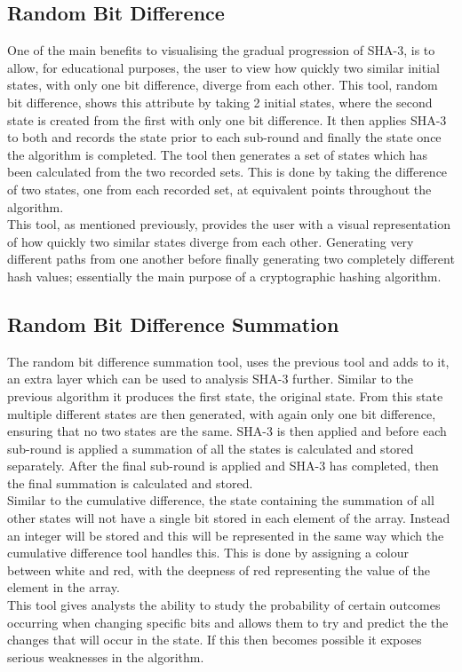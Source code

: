 \subsection{Random Bit Difference}
One of the main benefits to visualising the gradual progression of SHA-3, is to allow, for educational purposes, the user to view how quickly two similar initial states, with only one bit difference, diverge from each other. This tool, random bit difference, shows this attribute by taking 2 initial states, where the second state is created from the first with only one bit difference. It then applies SHA-3 to both and records the state prior to each sub-round and finally the state once the algorithm is completed. The tool then generates a set of states which has been calculated from the two recorded sets. This is done by taking the difference of two states, one from each recorded set, at equivalent points throughout the algorithm.
\vspace{5 mm}\\
This tool, as mentioned previously, provides the user with a visual representation of how quickly two similar states diverge from each other. Generating very different paths from one another before finally generating two completely different hash values; essentially the main purpose of a cryptographic hashing algorithm.
\subsection{Random Bit Difference Summation}
The random bit difference summation tool, uses the previous tool and adds to it, an extra layer which can be used to analysis SHA-3 further. Similar to the previous algorithm it produces the first state, the original state. From this state multiple different states are then generated, with again only one bit difference, ensuring that no two states are the same. SHA-3 is then applied and before each sub-round is applied a summation of all the states is calculated and stored separately. After the final sub-round is applied and SHA-3 has completed, then the final summation is calculated and stored. 
\vspace{5 mm}\\
Similar to the cumulative difference, the state containing the summation of all other states will not have a single bit stored in each element of the array. Instead an integer will be stored and this will be represented in the same way which the cumulative difference tool handles this. This is done by assigning a colour between white and red, with the deepness of red representing the value of the element in the array.
\vspace{5 mm}\\
This tool gives analysts the ability to study the probability of certain outcomes occurring when changing specific bits and allows them to try and predict the the changes that will occur in the state. If this then becomes possible it exposes serious weaknesses in the algorithm.
